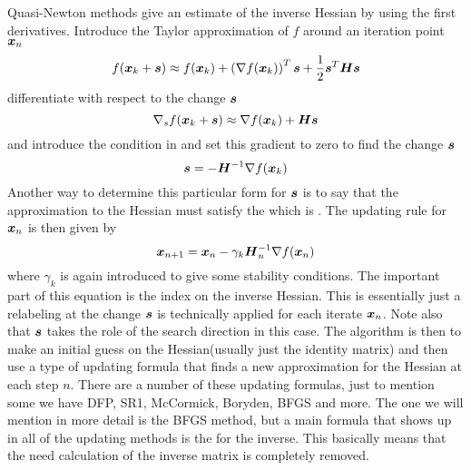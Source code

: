     Quasi-Newton methods give an estimate of the inverse Hessian by using the
    first derivatives. Introduce the Taylor approximation of $f$ around an
    iteration point $\boldsymbol{{x}}_n$
        \begin{equation}
            f(\boldsymbol{{x}}_k + \boldsymbol{{s}}) \approx f(\boldsymbol{{x}}_k) + \left(\nabla
            f(\boldsymbol{{x}}_k)\right)^T\boldsymbol{{s}} + \frac{1}{2}\boldsymbol{{s}}^T \boldsymbol{{H}}
            \boldsymbol{{s}}
        \end{equation}
    differentiate with respect to the change $\boldsymbol{{s}}$
        \begin{equation}
            \nabla_s f(\boldsymbol{{x}}_k + \boldsymbol{{s}}) \approx \nabla f(\boldsymbol{{x}}_k) +
            \boldsymbol{{H}}\boldsymbol{{s}}
            \label{eq:secantEquationNewton}
        \end{equation}
    and introduce the condition in  and set this
    gradient to zero to find the change $\boldsymbol{{s}}$
        \begin{equation}
            \boldsymbol{{s}} = -\boldsymbol{{H}}^{-1} \nabla f(\boldsymbol{{x}}_k)
        \end{equation}
    Another way to determine this particular form for $\boldsymbol{{s}}$ is to say that
    the approximation to the Hessian must satisfy the 
    which is . The updating rule for $\boldsymbol{{x}}_n$
    is then given by
        \begin{equation}
            \boldsymbol{{x}}_{n+1} = \boldsymbol{{x}}_n - \gamma_k\boldsymbol{{H}}^{-1}_n\nabla
            f(\boldsymbol{{x}}_n)
        \end{equation}
    where $\gamma_k$ is again introduced to give some stability conditions. The
    important part of this equation is the index on the inverse Hessian. This
    is essentially just a relabeling at the change $\boldsymbol{{s}}$ is technically
    applied for each iterate $\boldsymbol{{x}}_n$. Note also that $\boldsymbol{{s}}$ takes the
    role of the search direction in this case. The algorithm is then to make an
    initial guess on the Hessian(usually just the identity matrix) and then use
    a type of updating formula that finds a new approximation for the Hessian
    at each step $n$. There are a number of these updating formulas, just to
    mention some we have DFP, SR1, McCormick, Boryden, BFGS and more. The one
    we will mention in more detail is the BFGS method, but a main formula that
    shows up in all of the updating methods is the  for the inverse. This basically means that the need calculation of
    the inverse matrix is completely removed. \\

